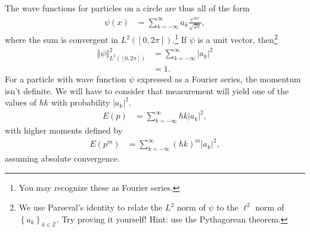 \documentclass[10pt]{extarticle}
\newcommand{\Z}{\mathbb{Z}}
\newcommand{\set}[1]{\left\{#1\right\}}
\newcommand{\norm}[1]{\left\Vert #1\right\Vert}
\theoremstyle{plain}
\theoremstyle{definition}
\theoremstyle{remark}
\begin{document}
  The wave functions for particles on a circle are thus all of the form
  \begin{align*}
    \psi(x) &= \sum_{k=-\infty}^{\infty} a_k\frac{e^{ikx}}{\sqrt{2\pi}},
  \end{align*}
  where the sum is convergent in $L^{2}([0,2\pi])$.\footnote{You may recognize these as Fourier series.} If $\psi$ is a unit vector, then\footnote{We use Parseval's identity to relate the $L^{2}$ norm of $\psi$ to the $\ell^{2}$ norm of $\set{a_k}_{k\in \Z}$. Try proving it yourself! Hint: use the Pythagorean theorem.}
  \begin{align*}
    \norm{\psi}_{L^{2}([0,2\pi])}^2 &= \sum_{k=-\infty}^{\infty}|a_k|^2\\
                                    &= 1.
  \end{align*}
  For a particle with wave function $\psi$ expressed as a Fourier series, the momentum isn't definite. We will have to consider that measurement will yield one of the values of $\hbar k$ with probability $|a_k|^2$.
  \begin{align*}
    E(p) &= \sum_{k=-\infty}^{\infty}\hbar k |a_k|^2,
  \end{align*}
  with higher moments defined by
  \begin{align*}
    E(p^m) &= \sum_{k=-\infty}^{\infty}(\hbar k)^{m}|a_k|^2,
  \end{align*}
  assuming absolute convergence.
\end{document}
